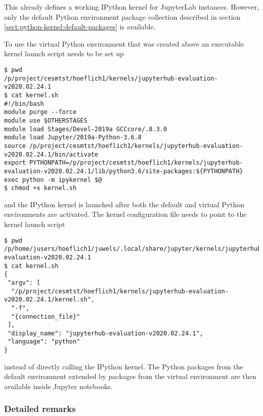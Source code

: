 This already defines a working IPython kernel for JupyterLab instances. 
However, only the default Python environment package collection described in section \ref{sect:python-kernel:default-packages} is available.

To use the virtual Python environment that was created above an executable kernel launch script needs to be set up
%
\begin{verbatim}
$ pwd
/p/project/cesmtst/hoeflich1/kernels/jupyterhub-evaluation-v2020.02.24.1
$ cat kernel.sh
#!/bin/bash
module purge --force
module use $OTHERSTAGES
module load Stages/Devel-2019a GCCcore/.8.3.0
module load Jupyter/2019a-Python-3.6.8
source /p/project/cesmtst/hoeflich1/kernels/jupyterhub-evaluation-v2020.02.24.1/bin/activate
export PYTHONPATH=/p/project/cesmtst/hoeflich1/kernels/jupyterhub-evaluation-v2020.02.24.1/lib/python3.6/site-packages:${PYTHONPATH}
exec python -m ipykernel $@
$ chmod +x kernel.sh
\end{verbatim}
%
and the IPython kernel is launched after both the default and virtual Python environments are activated.
The kernel configuration file needs to point to the kernel launch script
%
\begin{verbatim}
$ pwd
/p/home/jusers/hoeflich1/juwels/.local/share/jupyter/kernels/jupyterhub-evaluation-v2020.02.24.1
$ cat kernel.sh
{
 "argv": [
  "/p/project/cesmtst/hoeflich1/kernels/jupyterhub-evaluation-v2020.02.24.1/kernel.sh",
  "-f",
  "{connection_file}"
 ],
 "display_name": "jupyterhub-evaluation-v2020.02.24.1",
 "language": "python"
}
\end{verbatim}
%
instead of directly calling the IPython kernel.
The Python packages from the default environment extended by packages from the virtual environment are then available inside Jupyter notebooks.

\subsubsection{Detailed remarks}

